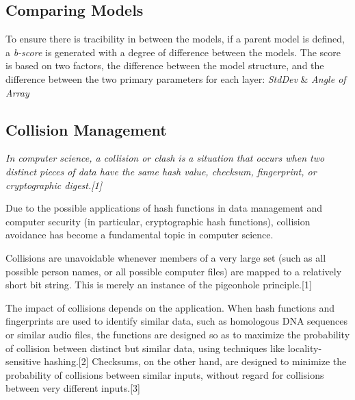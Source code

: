 \subsection{Comparing Models}
To ensure there is tracibility in between the models, if a parent model is defined, a \textit{b-score} is generated with a degree of difference between the models. The score is based on two factors, the difference between the model structure, and the difference between the two primary parameters for each layer: \textit{StdDev} \& \textit{Angle of Array}

\subsection{Collision Management}

{ \itshape
In computer science, a collision or clash is a situation that occurs when two distinct pieces of data have the same hash value, checksum, fingerprint, or cryptographic digest.[1]

Due to the possible applications of hash functions in data management and computer security (in particular, cryptographic hash functions), collision avoidance has become a fundamental topic in computer science.

Collisions are unavoidable whenever members of a very large set (such as all possible person names, or all possible computer files) are mapped to a relatively short bit string. This is merely an instance of the pigeonhole principle.[1]

The impact of collisions depends on the application. When hash functions and fingerprints are used to identify similar data, such as homologous DNA sequences or similar audio files, the functions are designed so as to maximize the probability of collision between distinct but similar data, using techniques like locality-sensitive hashing.[2] Checksums, on the other hand, are designed to minimize the probability of collisions between similar inputs, without regard for collisions between very different inputs.[3]
}

